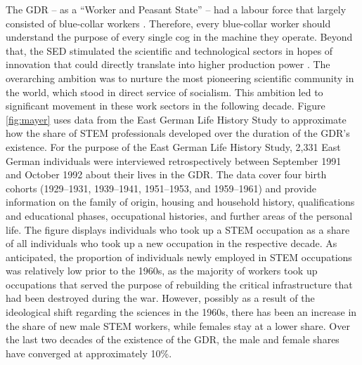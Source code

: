 \documentclass[a4paper, oneside, hyperfootnotes = false]{article}
\begin{document}
{%
The GDR -- as a ``Worker and Peasant State'' -- had a labour force that largely consisted of blue-collar workers \citep{DDRJahrbuch1957}.
Therefore, every blue-collar worker should understand the purpose of every single cog in the machine they operate.
Beyond that, the SED stimulated the scientific and technological sectors in hopes of innovation that could directly translate into higher production power \citep{Hoegselius2009}.
The overarching ambition was to nurture the most pioneering scientific community in the world, which stood in direct service of socialism.
This ambition led to significant movement in these work sectors in the following decade.
Figure \ref{fig:mayer} uses data from the East German Life History Study to approximate how the share of STEM professionals developed over the duration of the GDR's existence.
For the purpose of the East German Life History Study, 2,331 East German individuals were interviewed retrospectively between September 1991 and October 1992 about their lives in the GDR.
The data cover four birth cohorts (1929--1931, 1939--1941, 1951--1953, and 1959--1961) and provide information on the family of origin, housing and household history, qualifications and educational phases, occupational histories, and further areas of the personal life.
The figure displays individuals who took up a STEM occupation as a share of all individuals who took up a new occupation in the respective decade.
As anticipated, the proportion of individuals newly employed in STEM occupations was relatively low prior to the 1960s, as the majority of workers took up occupations that served the purpose of rebuilding the critical infrastructure that had been destroyed during the war.
However, possibly as a result of the ideological shift regarding the sciences in the 1960s, there has been an increase in the share of new male STEM workers, while females stay at a lower share.
Over the last two decades of the existence of the GDR, the male and female shares have converged at approximately 10\%.

}
\end{document}
